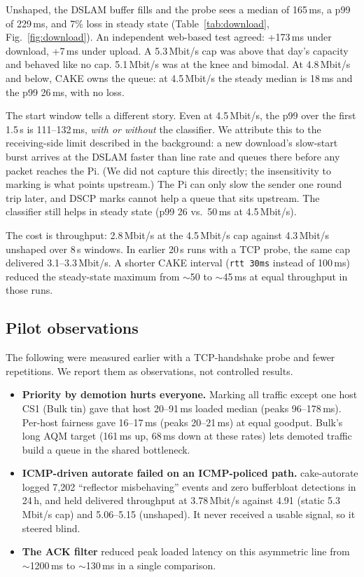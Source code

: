 \documentclass[10pt,twocolumn]{article}
\begin{document}
Unshaped, the DSLAM buffer fills and the probe sees a median of 165\,ms, a p99 of
229\,ms, and 7\% loss in steady state (Table~\ref{tab:download},
Fig.~\ref{fig:download}). An independent web-based test agreed: +173\,ms under
download, +7\,ms under upload. A 5.3\,Mbit/s cap was above that day's capacity
and behaved like no cap. 5.1\,Mbit/s was at the knee and bimodal. At
4.8\,Mbit/s and below, CAKE owns the queue: at 4.5\,Mbit/s the steady median is
18\,ms and the p99 26\,ms, with no loss.

The start window tells a different story. Even at 4.5\,Mbit/s, the p99 over the
first 1.5\,s is 111--132\,ms, \emph{with or without} the classifier. We
attribute this to the receiving-side limit described in the background: a new
download's slow-start burst arrives at the DSLAM faster than line rate and
queues there before any packet reaches the Pi. (We did not capture this
directly; the insensitivity to marking is what points upstream.) The Pi can only slow the sender one round trip later, and
DSCP marks cannot help a queue that sits upstream. The classifier still helps
in steady state (p99 26 vs.\ 50\,ms at 4.5\,Mbit/s).

The cost is throughput: 2.8\,Mbit/s at the 4.5\,Mbit/s cap against 4.3\,Mbit/s unshaped over
8\,s windows. In earlier 20\,s runs with a TCP probe, the same cap delivered
3.1--3.3\,Mbit/s. A shorter CAKE interval (\texttt{rtt 30ms} instead of 100\,ms)
reduced the steady-state maximum from ${\sim}$50 to ${\sim}$45\,ms at equal
throughput in those runs.

\subsection{Pilot observations}\label{sec:pilot}
The following were measured earlier with a TCP-handshake probe and fewer
repetitions. We report them as observations, not controlled results.
\begin{itemize}
\item \textbf{Priority by demotion hurts everyone.} Marking all traffic except
  one host CS1 (Bulk tin) gave that host 20--91\,ms loaded median (peaks
  96--178\,ms). Per-host fairness gave 16--17\,ms (peaks 20--21\,ms) at equal
  goodput. Bulk's long AQM target (161\,ms up, 68\,ms down at these rates) lets
  demoted traffic build a queue in the shared bottleneck.
\item \textbf{ICMP-driven autorate failed on an ICMP-policed path.}
  cake-autorate logged 7{,}202 ``reflector misbehaving'' events and zero
  bufferbloat detections in 24\,h, and held delivered throughput at 3.78\,Mbit/s
  against 4.91 (static 5.3\,Mbit/s cap) and 5.06--5.15 (unshaped). It never received a usable
  signal, so it steered blind.
\item \textbf{The ACK filter} reduced peak loaded latency on this asymmetric line
  from ${\sim}$1200\,ms to ${\sim}$130\,ms in a single comparison.
\end{itemize}
\end{document}
